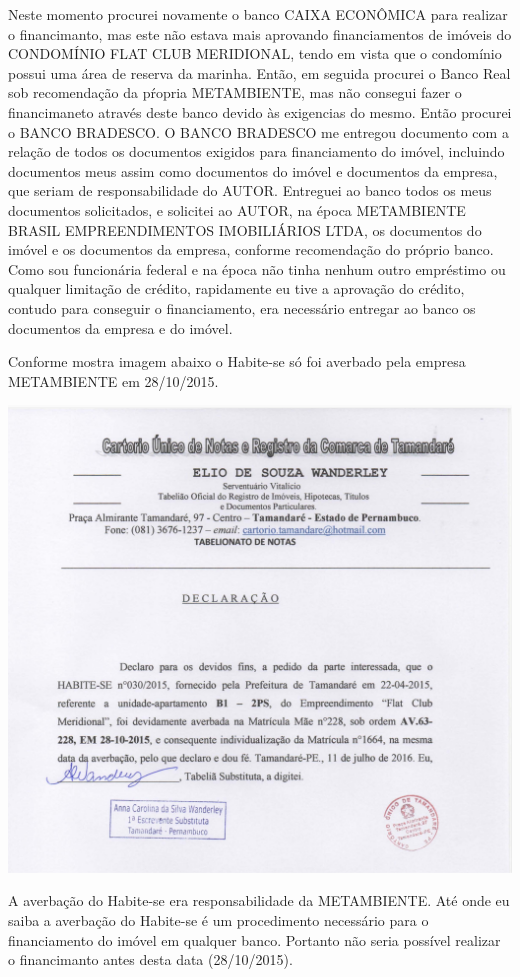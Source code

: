 \documentclass[11pt]{letter}
\begin{document}
Neste momento procurei novamente o banco CAIXA ECONÔMICA para realizar o financimanto, mas este não estava mais aprovando financiamentos de imóveis do CONDOMÍNIO FLAT CLUB MERIDIONAL, tendo em vista que o condomínio possui uma área de reserva da marinha. Então, em seguida procurei o Banco Real sob recomendação da pŕopria METAMBIENTE, mas não consegui fazer o financimaneto através deste banco devido às exigencias do mesmo. Então procurei o BANCO BRADESCO. O BANCO BRADESCO me entregou documento com a relação de todos os documentos exigidos para financiamento do imóvel, incluindo documentos meus assim como documentos do imóvel e documentos da empresa, que seriam de responsabilidade do AUTOR. Entreguei ao banco todos os meus documentos solicitados, e solicitei ao AUTOR, na época METAMBIENTE BRASIL EMPREENDIMENTOS IMOBILIÁRIOS LTDA, os documentos do imóvel e os documentos da empresa, conforme recomendação do próprio banco. Como sou funcionária federal e na época não tinha nenhum outro empréstimo ou qualquer limitação de crédito, rapidamente eu tive a aprovação do crédito, contudo para conseguir o financiamento, era necessário entregar ao banco os documentos da empresa e do imóvel.

Conforme mostra imagem abaixo o Habite-se só foi averbado pela empresa METAMBIENTE em 28/10/2015.

\includegraphics[width=\textwidth]{doc.png}

A averbação do Habite-se era responsabilidade da METAMBIENTE. Até onde eu saiba a averbação do Habite-se é um procedimento necessário para o financiamento do imóvel em qualquer banco. Portanto não seria possível realizar o financimanto antes desta data (28/10/2015).
\end{document}
